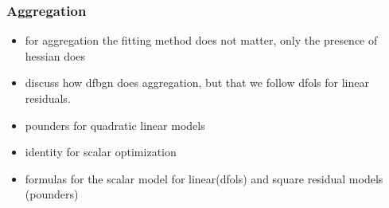 \subsubsection{Aggregation}
\label{subsubsec:aggregation}
\begin{itemize}
    \item for aggregation the fitting method does not matter, only the presence of hessian does
    \item discuss how dfbgn does aggregation, but that we follow dfols for linear residuals.
    \item pounders for quadratic linear models
    \item identity for scalar optimization
    \item formulas for the scalar model for linear(dfols) and square residual models (pounders)
\end{itemize}
